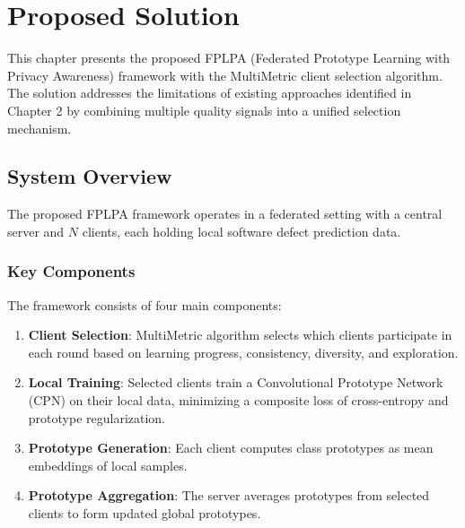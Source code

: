 \chapter{Proposed Solution}

This chapter presents the proposed FPLPA (Federated Prototype Learning with Privacy Awareness) framework with the MultiMetric client selection algorithm. The solution addresses the limitations of existing approaches identified in Chapter 2 by combining multiple quality signals into a unified selection mechanism.

\section{System Overview}

The proposed FPLPA framework operates in a federated setting with a central server and \(N\) clients, each holding local software defect prediction data.


\subsection{Key Components}

The framework consists of four main components:

\begin{enumerate}
    \item \textbf{Client Selection}: MultiMetric algorithm selects which clients participate in each round based on learning progress, consistency, diversity, and exploration.
    
    \item \textbf{Local Training}: Selected clients train a Convolutional Prototype Network (CPN) on their local data, minimizing a composite loss of cross-entropy and prototype regularization.
    
    \item \textbf{Prototype Generation}: Each client computes class prototypes as mean embeddings of local samples.
    
    \item \textbf{Prototype Aggregation}: The server averages prototypes from selected clients to form updated global prototypes.
\end{enumerate}

